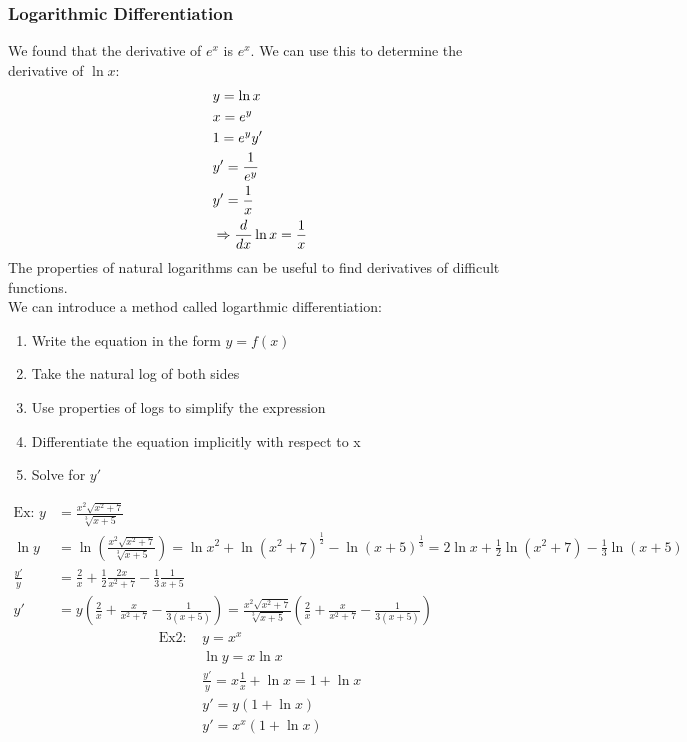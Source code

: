 \documentclass[11pt, fleqn]{article}
\begin{document}
\subsubsection{Logarithmic Differentiation}
We found that the derivative of $e^x$ is $e^x$. We can use this to determine the derivative of $\ln x$:
\begin{align*}
    &y=\ln x\\
    &x=e^y\\
    &1=e^yy'\\
    &y'=\frac{1}{e^y}\\
    &y'=\frac{1}{x}\\
    &\Rightarrow\frac{d}{dx}\ln x=\frac{1}{x}
\end{align*}
The properties of natural logarithms can be useful to find derivatives of difficult functions.\\
We can introduce a method called logarthmic differentiation:
\begin{enumerate}
    \item Write the equation in the form $y=f(x)$
    \item Take the natural log of both sides
    \item Use properties of logs to simplify the expression
    \item Differentiate the equation implicitly with respect to x
    \item Solve for $y'$
\end{enumerate}
\begin{align*}
    \text{Ex: }y&=\frac{x^2\sqrt{x^2+7}}{\sqrt[3]{x+5}}\\
    \ln y&=\ln\left(\frac{x^2\sqrt{x^2+7}}{\sqrt[3]{x+5}}\right)=\ln x^2+\ln(x^2+7)^\frac{1}{2}-\ln(x+5)^\frac{1}{3}=2\ln x+\frac{1}{2}\ln(x^2+7)-\frac{1}{3}\ln(x+5)\\
    \frac{y'}{y}&=\frac{2}{x}+\frac{1}{2}\frac{2x}{x^2+7}-\frac{1}{3}\frac{1}{x+5}\\
    y'&=y\left(\frac{2}{x}+\frac{x}{x^2+7}-\frac{1}{3(x+5)}\right)=\frac{x^2\sqrt{x^2+7}}{\sqrt[3]{x+5}}\left(\frac{2}{x}+\frac{x}{x^2+7}-\frac{1}{3(x+5)}\right)
\end{align*}
\begin{align*}
    \text{Ex2: }&y=x^x\\
    &\ln y=x\ln x\\
    &\frac{y'}{y}=x\frac{1}{x}+\ln x=1+\ln x\\
    &y'=y(1+\ln x)\\
    &y'=x^x(1+\ln x)
\end{align*}
\end{document}
